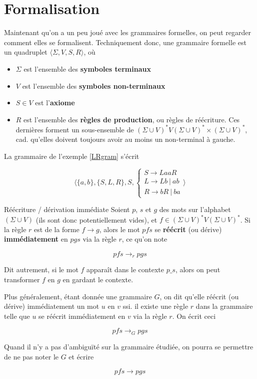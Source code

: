  \section{Formalisation}
 
 Maintenant qu'on a un peu joué avec les grammaires formelles, on peut regarder comment elles se formalisent. Techniquement donc, une grammaire formelle est un quadruplet $\big \langle\Sigma, V, S, R \big \rangle$, où
 
 \begin{itemize}
 \item $\Sigma$ est l'ensemble des \textbf{symboles terminaux}
 \item $V$ est l'ensemble des \textbf{symboles non-terminaux}
 \item $S \in V$ est l'\textbf{axiome}
 \item $R$ est l'ensemble des \textbf{règles de production}, ou règles de réécriture. Ces dernières forment un sous-ensemble de $(\Sigma \cup V)^*V(\Sigma \cup V)^* \times (\Sigma \cup V)^*$, cad. qu'elles doivent toujours avoir au moins un non-terminal à gauche. 
 \end{itemize}
 
 
 
\begin{example}
\label{grammLR}
La grammaire de l'exemple \ref{LRgram} s'écrit 

\[
\big \langle \{a,b\},\{S,L,R\},S, \begin{cases}
S \rightarrow LaaR \\
L \rightarrow Lb~|~ab \\
R \rightarrow bR~|~ba
\end{cases}
 \big \rangle
\]


\begin{definition}{Réécriture / dérivation immédiate}{}
Soient $p$, $s$ et $g$ des mots sur l'alphabet $(\Sigma \cup V)$ (ils sont donc potentiellement vides), et $f \in (\Sigma \cup V)^*V(\Sigma \cup V)^*$. Si la règle $r$ est de la forme $f \rightarrow g$, alors le mot $pfs$ se \textbf{réécrit} (ou dérive) \textbf{immédiatement} en $pgs$ via la règle $r$, ce qu'on note 

\[
pfs \rightarrow_r pgs
\]

Dit autrement, si le mot $f$ apparaît dans le contexte $p \_ s$, alors on peut transformer $f$ en $g$ en gardant le contexte.

Plus généralement, étant donnée une grammaire $G$, on dit qu'elle réécrit (ou dérive) immédiatement un mot $u$ en $v$ ssi. il existe une règle $r$ dans la grammaire telle que $u$ se réécrit immédiatement en $v$ via la règle $r$. On écrit ceci 

\[
pfs \rightarrow_G pgs
\]

Quand il n'y a pas d'ambiguïté sur la grammaire étudiée, on pourra se permettre de ne pas noter le $G$ et écrire 

\[
pfs \rightarrow pgs
\]

\end{definition}

\end{example}


